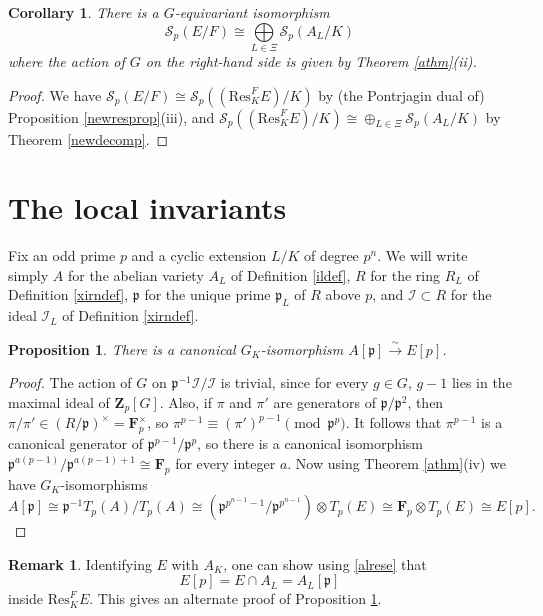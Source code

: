 \documentclass[reqno]{amsart}
\newtheorem{cor}[thm]{Corollary}
\newtheorem{prop}[thm]{Proposition}
\theoremstyle{definition}
\newtheorem{rem}[thm]{Remark}
\def\Z{\mathbf{Z}}
\def\F{\mathbf{F}}
\def\Zp{\Z_p}
\def\Fp{\F_p}
\def\cS{\mathcal{S}}
\def\I{\mathcal{I}}
\def\P{\mathfrak{p}}
\def\Res{\mathrm{Res}}
\def\Scp{\cS_p}
\def\isom{\xrightarrow{\sim}}
\def\dirsum#1{\underset{#1}{\textstyle\bigoplus}}
\begin{document}
\begin{cor}
\label{newressca}
There is a $G$-equivariant isomorphism 
$$
\Scp(E/F) \cong \dirsum{L\in\Xi} \Scp(A_L/K)
$$
where the action of $G$ on the right-hand side is 
given by Theorem \ref{athm}(ii).
\end{cor}

\begin{proof}
We have $\Scp(E/F) \cong \Scp((\Res^F_K E)/K)$ by (the Pontrjagin dual of) 
Proposition \ref{newresprop}(iii), and 
$\Scp((\Res^F_K E)/K) \cong \oplus_{L \in \Xi} \Scp(A_L/K)$
by Theorem \ref{newdecomp}.
\end{proof}


\section{The local invariants}
\label{localinv}

Fix an odd prime $p$ and a cyclic extension $L/K$ of degree $p^n$.  We will 
write simply $A$ for the abelian variety $A_L$ of Definition \ref{ildef},  
$R$ for the ring $R_L$ of Definition \ref{xirndef}, $\P$ for the unique prime 
$\P_L$ of $R$ above $p$, and $\I \subset R$ for the ideal $\I_L$ of 
Definition \ref{xirndef}.

\begin{prop}
\label{moreresprop}
There is a canonical $G_K$-isomorphism $A[\P] \isom E[p]$.
\end{prop}

\begin{proof}
The action of $G$ on $\P^{-1}\I/\I$ is trivial, 
since for every $g \in G$, $g-1$ lies in the maximal ideal of $\Zp[G]$.
Also, if $\pi$ and $\pi'$ are generators 
of $\P/\P^2$, then $\pi/\pi' \in (R/\P)^\times = \Fp^\times$, so 
$\pi^{p-1} \equiv (\pi')^{p-1} \pmod{\P^{p}}$.  It follows that 
$\pi^{p-1}$ is a canonical generator of $\P^{p-1}/\P^p$, so there is 
a canonical isomorphism $\P^{a(p-1)}/\P^{a(p-1)+1} \cong \Fp$ 
for every integer $a$.
Now using Theorem \ref{athm}(iv) we have $G_K$-isomorphisms 
$$
A[\P] \cong \P^{-1}T_p(A)/T_p(A) \cong (\P^{p^{n-1}-1}/\P^{p^{n-1}}) \otimes T_p(E) 
    \cong\Fp \otimes T_p(E) \cong E[p].
$$
\end{proof}

\begin{rem}
Identifying $E$ with $A_K$, one can show using \eqref{alrese} 
that $$E[p] = E \cap A_L = A_L[\P]$$ inside $\Res^F_K E$.  
This gives an alternate proof of Proposition \ref{moreresprop}.
\end{rem}
\end{document}
